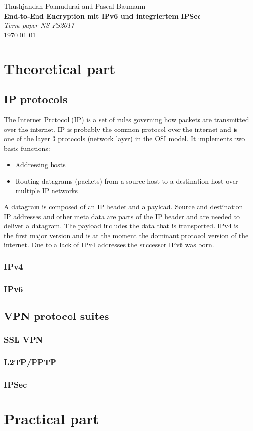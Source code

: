 \documentclass[a4paper]{report}
\newcommand*{\titleAP}{\begingroup %
	\centering
	\vspace*{\baselineskip} %
	
	{\Large Thushjandan Ponnudurai} and {\Large Pascal Baumann}\\[0.167\textheight] %
	
	{\Huge\bfseries End-to-End Encryption mit IPv6 und integriertem IPSec}\\[\baselineskip]
	
	{\Large \textit{Term paper NS FS2017}}\\
	\today
	
	\vspace*{3\baselineskip} %
	\endgroup}
\begin{document}
\titleAP

\newpage

\begin{abstract}
	\blindtext
\end{abstract}

\tableofcontents

\newpage

\chapter{Theoretical part}
\label{ch:Theory}

\section{IP protocols}
\label{sec:IPprot}
The Internet Protocol (IP) is a set of rules governing how packets are transmitted over the internet. IP is probably the common protocol over the internet and is one of the layer 3 protocols (network layer) in the OSI model. It implements two basic functions:
\begin{itemize}
	\item Addressing hosts
	\item Routing datagrams (packets) from a source host to a destination host over multiple IP networks
\end{itemize}
A datagram is composed of an IP header and a payload. Source and destination IP addresses and other meta data are parts of the IP header and are needed to deliver a datagram. The payload includes the data that is transported.
IPv4 is the first major version and is at the moment the dominant protocol version of the internet. Due to a lack of IPv4 addresses the successor IPv6 was born. \parencite{NadeemUnuth2016}

\subsection{IPv4}
\label{ssec:IPv4}


\subsection{IPv6}
\label{ssec:IPv6}

\section{VPN protocol suites}
\label{sec:VPNs}

\subsection{SSL VPN}
\label{ssec:sslvpn}

\subsection{L2TP/PPTP}
\label{ssec:l2tppptp}

\subsection{IPSec}
\label{ssec:IPSec}


\chapter{Practical part}
\label{ch:Practical}

\newpage

\printbibliography
\end{document}

